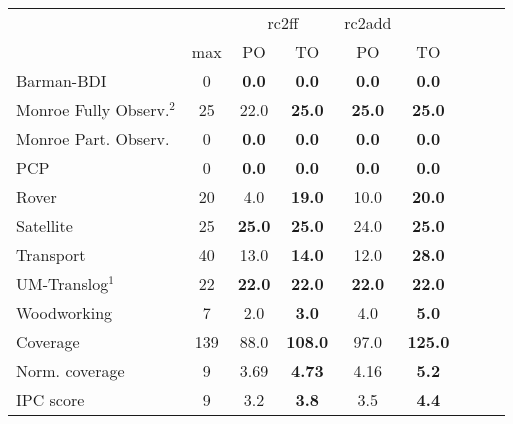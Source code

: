 \begin{tabular}{lccccccccl} 
\toprule 
  && \multicolumn{2}{c}{rc2ff} & \multicolumn{2}{c}{rc2add} \\ 
\cmidrule(lr){3-4} \cmidrule(lr){5-6}  
 & max &PO & TO & PO &\multicolumn{2}{c}{ TO  } \\ 
\midrule 
Barman-BDI & 0 & \textbf{0.0} & \textbf{0.0} & \textbf{0.0} &\multicolumn{2}{c}{ \textbf{0.0}  } \\ 
Monroe Fully Observ.$^{2}$ & 25 & 22.0 & \textbf{25.0} & \textbf{25.0} &\multicolumn{2}{c}{ \textbf{25.0}  } \\ 
Monroe Part. Observ. & 0 & \textbf{0.0} & \textbf{0.0} & \textbf{0.0} &\multicolumn{2}{c}{ \textbf{0.0}  } \\ 
PCP & 0 & \textbf{0.0} & \textbf{0.0} & \textbf{0.0} &\multicolumn{2}{c}{ \textbf{0.0}  } \\ 
Rover & 20 & 4.0 & \textbf{19.0} & 10.0 &\multicolumn{2}{c}{ \textbf{20.0}  } \\ 
Satellite & 25 & \textbf{25.0} & \textbf{25.0} & 24.0 &\multicolumn{2}{c}{ \textbf{25.0}  } \\ 
Transport & 40 & 13.0 & \textbf{14.0} & 12.0 &\multicolumn{2}{c}{ \textbf{28.0}  } \\ 
UM-Translog$^{1}$ & 22 & \textbf{22.0} & \textbf{22.0} & \textbf{22.0} &\multicolumn{2}{c}{ \textbf{22.0}  } \\ 
Woodworking & 7 & 2.0 & \textbf{3.0} & 4.0 &\multicolumn{2}{c}{ \textbf{5.0}  } \\ 
\midrule 
 Coverage & 139 & 88.0 & \textbf{108.0} & 97.0 &\multicolumn{2}{c}{ \textbf{125.0}  } \\ 
Norm. coverage & 9 & 3.69 & \textbf{4.73} & 4.16 &\multicolumn{2}{c}{ \textbf{5.2}  } \\ 
IPC score & 9 & 3.2 & \textbf{3.8} & 3.5 &\multicolumn{2}{c}{ \textbf{4.4}  } \\ 
\bottomrule 
 \end{tabular} 
